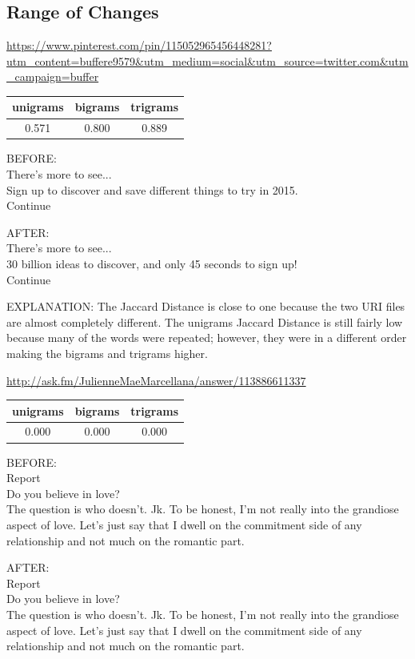 \documentclass[12pt]{article}
\begin{document}
\subsection{Range of Changes}
\url{https://www.pinterest.com/pin/115052965456448281?utm_content=buffere9579&utm_medium=social&utm_source=twitter.com&utm_campaign=buffer}\\
\begin{tabular}{|c|c|c|}
    \hline
    unigrams & bigrams & trigrams\\
    \hline
    0.571 & 0.800 & 0.889\\
    \hline
\end{tabular}

BEFORE:\\
There’s more to see...\\
Sign up to discover and save different things to try in 2015.\\
Continue 

AFTER:\\
There’s more to see...\\
30 billion ideas to discover, and only 45 seconds to sign up!\\
Continue

EXPLANATION: The Jaccard Distance is close to one because the two URI files are almost completely different. The unigrams Jaccard Distance is still fairly low because many of the words were repeated; however, they were in a different order making the bigrams and trigrams higher.


\url{http://ask.fm/JulienneMaeMarcellana/answer/113886611337}\\
\begin{tabular}{|c|c|c|}
    \hline
    unigrams & bigrams & trigrams\\
    \hline
    0.000 & 0.000 & 0.000\\
    \hline
\end{tabular}

BEFORE:\\
Report\\
Do you believe in love?\\
The question is who doesn't. Jk. To be honest, I'm not really into the grandiose aspect of love. Let's just say that I dwell on the commitment side of any relationship and not much on the romantic part.

AFTER:\\
Report\\
Do you believe in love?\\
The question is who doesn't. Jk. To be honest, I'm not really into the grandiose aspect of love. Let's just say that I dwell on the commitment side of any relationship and not much on the romantic part.
\end{document}
